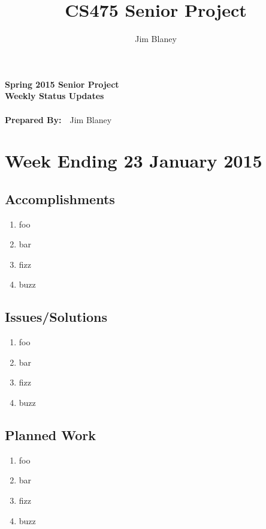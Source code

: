 \documentclass[11pt]{article}
\title{CS475 Senior Project}
\author{Jim Blaney}
\begin{document}
\thispagestyle{empty} %


\begin{center}

{\fontsize{12pt}{0pt}\selectfont \textbf{Spring 2015 Senior Project \\ Weekly Status Updates}} \\[1em]
{\fontsize{12pt}{0pt}} \\[1em]
{\fontsize{12pt}{0pt}\selectfont \textbf{Prepared By:}~~Jim Blaney} \\[2em]

\end{center}


\section*{Week Ending 23 January 2015}
\subsection*{Accomplishments}

\begin{enumerate}
\item foo
\item bar
\item fizz
\item buzz
\end{enumerate}

\subsection*{Issues/Solutions}

\begin{enumerate}
\item foo
\item bar
\item fizz
\item buzz
\end{enumerate}

\subsection*{Planned Work}

\begin{enumerate}
\item foo
\item bar
\item fizz
\item buzz
\end{enumerate}

\end{document}
